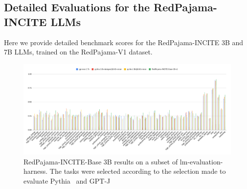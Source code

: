 \documentclass{article}
\begin{document}
\subsection{Detailed Evaluations for the RedPajama-INCITE LLMs}
\label{sec:apx-rp-incite-results}
Here we provide detailed benchmark scores for the RedPajama-INCITE 3B and 7B LLMs, trained on the RedPajama-V1 dataset. 
\begin{figure}[!tbp]
    \centering
    \includegraphics[width=\textwidth]{figures/rp_incite.png}
    \caption{RedPajama-INCITE-Base 3B results on a subset of lm-evaluation-harness. The tasks were selected according to the selection made to evaluate Pythia~\cite{biderman2023pythia} and GPT-J~\cite{gpt-j}}
    \label{fig:rp-incite-7b-eval}
\end{figure}
\begin{table}[!tbp]
\centering
\caption{Results for RedPajama-INCITE-Base-3B-v1 on a subset of lm-evaluation-harness (Zero-Shot) and HELM, compared to models with similar parameter counts. The top-scoring model for each benchmark is highlighted in {\bf bold} font.}
\label{tab:rp-3b-eval}
\end{table}
\end{document}
